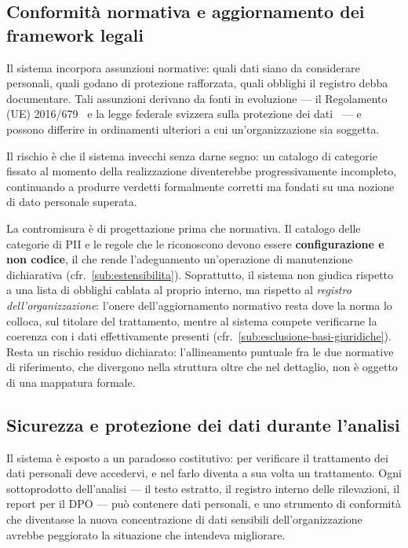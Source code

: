 \subsection{Conformità normativa e aggiornamento dei framework legali}
\label{sub:rischio-conformita-normativa}
Il sistema incorpora assunzioni normative: quali dati siano da considerare personali, quali godano di protezione rafforzata, quali obblighi il registro debba documentare. Tali assunzioni derivano da fonti in evoluzione --- il Regolamento (UE) 2016/679~\cite{RegolamentoUE20162016} e la legge federale svizzera sulla protezione dei dati~\cite{RS2351Legge} --- e possono differire in ordinamenti ulteriori a cui un'organizzazione sia soggetta. \medskip

Il rischio è che il sistema invecchi senza darne segno: un catalogo di categorie fissato al momento della realizzazione diventerebbe progressivamente incompleto, continuando a produrre verdetti formalmente corretti ma fondati su una nozione di dato personale superata. \medskip

La contromisura è di progettazione prima che normativa. Il catalogo delle categorie di PII e le regole che le riconoscono devono essere \textbf{configurazione e non codice}, il che rende l'adeguamento un'operazione di manutenzione dichiarativa (cfr.~\ref{sub:estensibilita}). Soprattutto, il sistema non giudica rispetto a una lista di obblighi cablata al proprio interno, ma rispetto al \emph{registro dell'organizzazione}: l'onere dell'aggiornamento normativo resta dove la norma lo colloca, sul titolare del trattamento, mentre al sistema compete verificarne la coerenza con i dati effettivamente presenti (cfr.~\ref{sub:esclusione-basi-giuridiche}). Resta un rischio residuo dichiarato: l'allineamento puntuale fra le due normative di riferimento, che divergono nella struttura oltre che nel dettaglio, non è oggetto di una mappatura formale.

\subsection{Sicurezza e protezione dei dati durante l'analisi}
\label{sub:rischio-sicurezza-dati}
Il sistema è esposto a un paradosso costitutivo: per verificare il trattamento dei dati personali deve accedervi, e nel farlo diventa a sua volta un trattamento. Ogni sottoprodotto dell'analisi --- il testo estratto, il registro interno delle rilevazioni, il report per il DPO --- può contenere dati personali, e uno strumento di conformità che diventasse la nuova concentrazione di dati sensibili dell'organizzazione avrebbe peggiorato la situazione che intendeva migliorare. \medskip

